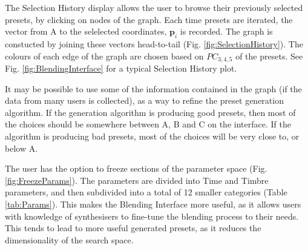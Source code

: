 \documentclass[11pt, oneside]{report}   	%
\renewcommand{\vec}[1]{\mathbf{#1}}
\begin{document}
The Selection History display allows the user to browse their previously selected presets, by clicking on nodes of the graph. Each time presets are iterated, the vector from A to the selelected coordinates, $\vec{p}_i$ is recorded. The graph is constucted by joining these vectors head-to-tail (Fig. \ref{fig:SelectionHistory}). The colours of each edge of the graph are chosen based on $PC_{3,4,5}$ of the presets. See Fig. \ref{fig:BlendingInterface} for a typical  Selection History plot.

It may be possible to use some of the information contained in the graph (if the data from many users is collected), as a way to refine the preset generation algorithm. If the generation algorithm is producing good presets, then most of the choices should be somewhere between A, B and C on the interface. If the algorithm is producing bad presets, most of the choices will be very close to, or below A.

The user has the option to freeze sections of the parameter space (Fig. \ref{fig:FreezeParams}). The parameters are divided into Time and Timbre parameters, and then subdivided into a total of 12 smaller categories (Table \ref{tab:Params}). This makes the Blending Interface more useful, as it allows users with knowledge of synthesisers to fine-tune the blending process to their needs. This tends to lead to more useful generated presets, as it reduces the dimensionality of the search space.
\end{document}

